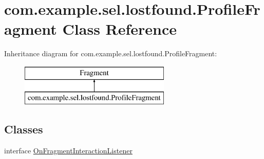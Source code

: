 \hypertarget{classcom_1_1example_1_1sel_1_1lostfound_1_1ProfileFragment}{\section{com.\-example.\-sel.\-lostfound.\-Profile\-Fragment Class Reference}
\label{classcom_1_1example_1_1sel_1_1lostfound_1_1ProfileFragment}
}
Inheritance diagram for com.\-example.\-sel.\-lostfound.\-Profile\-Fragment\-:\begin{figure}[H]
\begin{center}
\leavevmode
\includegraphics[height=2.000000cm]{classcom_1_1example_1_1sel_1_1lostfound_1_1ProfileFragment}
\end{center}
\end{figure}
\subsection*{Classes}
\begin{DoxyCompactItemize}
\item 
interface \hyperlink{interfacecom_1_1example_1_1sel_1_1lostfound_1_1ProfileFragment_1_1OnFragmentInteractionListener}{On\-Fragment\-Interaction\-Listener}
\end{DoxyCompactItemize}
